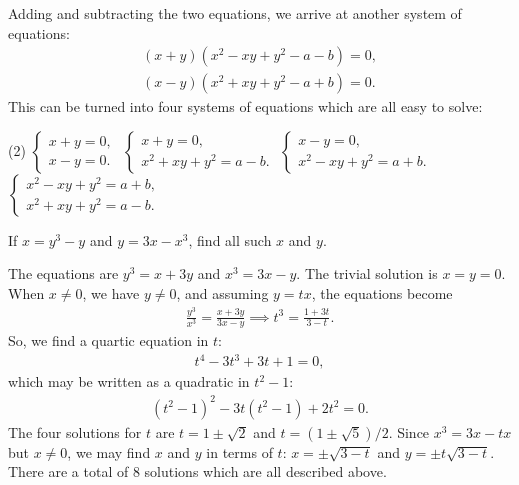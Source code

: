 \documentclass[12pt,a4paper]{memoir}
\theoremstyle{definition}
\begin{document}
\begin{solution}
	Adding and subtracting the two equations, we arrive at another system of equations:
	\begin{align*}
		(x+y)(x^2-xy+y^2-a-b)=0,\\ (x-y)(x^2+xy+y^2-a+b)=0.
	\end{align*}
	This can be turned into four systems of equations which are all easy to solve:
	\begin{tasks}(2)
		\task $\begin{cases}
			x+y=0,\\x-y=0.
		\end{cases}$
		\task $\begin{cases}
			x+y=0,\\ x^2+xy+y^2=a-b.
		\end{cases}$
		\task $\begin{cases}
			x-y=0,\\ x^2 - xy + y^2 = a+b.
		\end{cases}$
		\task $\begin{cases}
			x^2-xy+y^2 = a+b,\\ x^2+xy+y^2 = a-b.
		\end{cases}$
	\end{tasks}
\end{solution}

\begin{question}
	If $x=y^3-y$ and $y=3x-x^3$, find all such $x$ and $y$.
\end{question}

\begin{solution}
	The equations are $y^3=x+3y$ and $x^3=3x-y$. The trivial solution is $x=y=0$. When $x\neq 0$, we have $y\neq 0$, and assuming $y=tx$, the equations become
	\begin{align*}
		\frac{y^3}{x^3}= \frac{x+3y}{3x-y} \implies t^3 = \frac{1+3t}{3-t}.
	\end{align*}
	So, we find a quartic equation in $t$:
	\begin{align*}
		t^4-3t^3+3t+1=0,
	\end{align*}
	which may be written as a quadratic in $t^2-1$:
	\begin{align*}
		(t^2-1)^2 -3t(t^2-1) + 2t^2 = 0.
	\end{align*}
	The four solutions for $t$ are $t=1\pm \sqrt{2}$ and $t=(1\pm\sqrt{5})/2$. Since $x^3=3x-tx$ but $x\neq 0$, we may find $x$ and $y$ in terms of $t$: $x=\pm\sqrt{3-t}$ and $y=\pm t\sqrt{3-t}$. There are a total of $8$ solutions which are all described above.
\end{solution}
\end{document}
